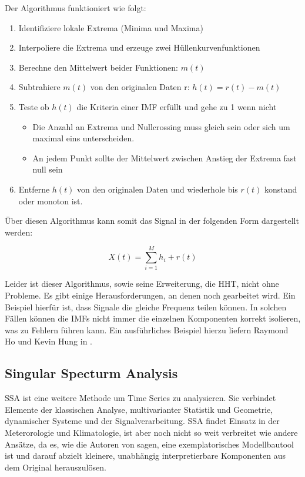 Der Algorithmus funktioniert wie folgt:
\begin{enumerate}
    \item Identifiziere lokale Extrema (Minima und Maxima)
    \item Interpoliere die Extrema und erzeuge zwei Hüllenkurvenfunktionen
    \item Berechne den Mittelwert beider Funktionen: \(m(t)\)
    \item Subtrahiere \(m(t)\) von den originalen Daten r: \(h(t) = r(t) - m(t)\)
    \item Teste ob \(h(t)\) die Kriteria einer \ac{IMF} erfüllt und gehe zu 1 wenn nicht
          \begin{itemize}
              \item Die Anzahl an Extrema und Nullcrossing muss gleich sein oder sich um maximal eins unterscheiden.
              \item An jedem Punkt sollte der Mittelwert zwischen Anstieg der Extrema fast null sein
          \end{itemize}
    \item Entferne \(h(t)\) von den originalen Daten und wiederhole bis \(r(t)\) konstand oder monoton ist.
\end{enumerate}
Über diesen Algorithmus kann somit das Signal in der folgenden Form dargestellt werden:

\begin{equation}
    \label{for:signal_representation}
    X(t) = \sum_{i=1}^{M} h_i + r(t)
\end{equation}

Leider ist dieser Algorithmus, sowie seine Erweiterung, die \acf{HHT}, nicht ohne Probleme. 
Es gibt einige Herausforderungen, an denen noch gearbeitet wird. Ein Beispiel hierfür ist, dass Signale die gleiche Frequenz teilen können. In solchen Fällen können die \ac{IMF}s 
nicht immer die einzelnen Komponenten korrekt isolieren, was zu Fehlern führen kann. Ein ausführliches Beispiel hierzu liefern Raymond Ho und Kevin Hung in \cite{9794540}.



\subsection{Singular Specturm Analysis}
\label{techniques:SSA}
\acl{SSA} ist eine weitere Methode um Time Series zu analysieren. Sie verbindet Elemente der klassischen Analyse, multivarianter
Statistik und Geometrie, dynamischer Systeme und der Signalverarbeitung.\cite{anaOfSSA}
\ac{SSA} findet Einsatz in der Meterorologie und Klimatologie, ist aber noch nicht so weit verbreitet wie andere Ansätze,
da es, wie die Autoren von \cite{anaOfSSA} sagen, eine exemplatorisches Modellbautool ist und darauf abzielt kleinere, unabhängig
interpretierbare Komponenten aus dem Original herauszulösen.

